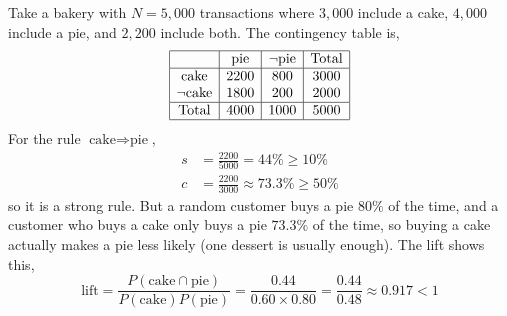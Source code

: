 \documentclass[12pt,letterpaper, onecolumn]{exam}
\begin{document}
\begin{questions}
    \begin{solution}

        Take a bakery with $N=5{,}000$ transactions where $3{,}000$ include a cake, $4{,}000$ include a pie, and $2{,}200$ include both. The contingency table is,
        \begin{equation*}
            \begin{array}{|c|c|c|c|}
                \hline & \text{pie} & \neg\text{pie} & \text{Total} \\ \hline
                \text{cake} & 2200 & 800 & 3000 \\
                \neg\text{cake} & 1800 & 200 & 2000 \\ \hline
                \text{Total} & 4000 & 1000 & 5000 \\ \hline
            \end{array}
        \end{equation*}
        For the rule $\text{cake}\Rightarrow\text{pie}$,
        \begin{align*}
            s &= \frac{2200}{5000} = 44\% \geq 10\% \\
            c &= \frac{2200}{3000} \approx 73.3\% \geq 50\%
        \end{align*}
        so it is a strong rule. But a random customer buys a pie $80\%$ of the time, and a customer who buys a cake only buys a pie $73.3\%$ of the time, so buying a cake actually makes a pie less likely (one dessert is usually enough). The lift shows this,
        \begin{equation*}
            \text{lift} = \frac{P(\text{cake}\cap\text{pie})}{P(\text{cake})P(\text{pie})} = \frac{0.44}{0.60\times0.80} = \frac{0.44}{0.48} \approx 0.917 < 1
        \end{equation*}


\end{solution}
\end{questions}
\end{document}
